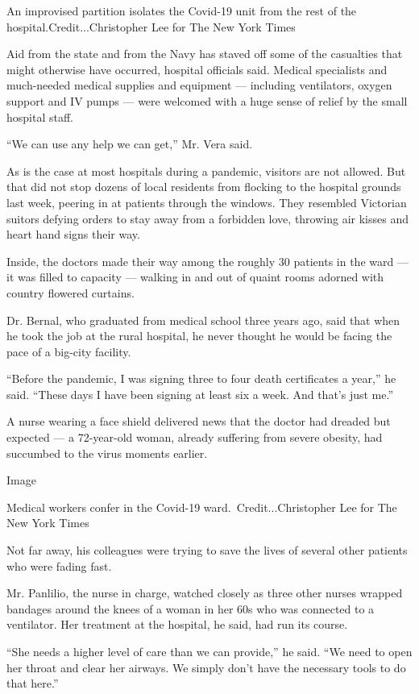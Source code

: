An improvised partition isolates the Covid-19 unit from the rest of the
hospital.Credit...Christopher Lee for The New York Times

Aid from the state and from the Navy has staved off some of the
casualties that might otherwise have occurred, hospital officials said.
Medical specialists and much-needed medical supplies and equipment ---
including ventilators, oxygen support and IV pumps --- were welcomed
with a huge sense of relief by the small hospital staff.

``We can use any help we can get,'' Mr. Vera said.

As is the case at most hospitals during a pandemic, visitors are not
allowed. But that did not stop dozens of local residents from flocking
to the hospital grounds last week, peering in at patients through the
windows. They resembled Victorian suitors defying orders to stay away
from a forbidden love, throwing air kisses and heart hand signs their
way.

Inside, the doctors made their way among the roughly 30 patients in the
ward --- it was filled to capacity --- walking in and out of quaint
rooms adorned with country flowered curtains.

Dr. Bernal, who graduated from medical school three years ago, said that
when he took the job at the rural hospital, he never thought he would be
facing the pace of a big-city facility.

``Before the pandemic, I was signing three to four death certificates a
year,'' he said. ``These days I have been signing at least six a week.
And that's just me.''

A nurse wearing a face shield delivered news that the doctor had dreaded
but expected --- a 72-year-old woman, already suffering from severe
obesity, had succumbed to the virus moments earlier.

Image

Medical workers confer in the Covid-19 ward.~Credit...Christopher Lee
for The New York Times

Not far away, his colleagues were trying to save the lives of several
other patients who were fading fast.

Mr. Panlilio, the nurse in charge, watched closely as three other nurses
wrapped bandages around the knees of a woman in her 60s who was
connected to a ventilator. Her treatment at the hospital, he said, had
run its course.

``She needs a higher level of care than we can provide,'' he said. ``We
need to open her throat and clear her airways. We simply don't have the
necessary tools to do that here.''

